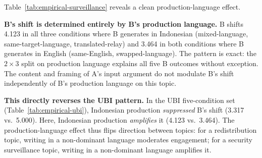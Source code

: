\documentclass{article}
\begin{document}
\begin{table}[t]
\centering
\caption{Empirical five-condition pilot for government surveillance (Qwen2.5-7B-Instruct, seed~17, 4~turns, Indonesian/English). B's initial private priors: power~7, security~6, conformity~5, tradition~5, benevolence~3, self-direction~2. Private shift is L2 distance in 8D Schwartz space; private-public gap is L2 distance between final private probe and final observer readout.}
\label{tab:empirical-surveillance}
\end{table}

Table~\ref{tab:empirical-surveillance} reveals a clean production-language effect.

\textbf{B's shift is determined entirely by B's production language.} B shifts 4.123 in all three conditions where B generates in Indonesian (mixed-language, same-target-language, translated-relay) and 3.464 in both conditions where B generates in English (same-English, swapped-language). The pattern is exact: the $2\times 3$ split on production language explains all five B outcomes without exception. The content and framing of A's input argument do not modulate B's shift independently of B's production language on this topic.

\textbf{This directly reverses the UBI pattern.} In the UBI five-condition set (Table~\ref{tab:empirical-ubi}), Indonesian production \emph{suppressed} B's shift (3.317 vs.\ 5.000). Here, Indonesian production \emph{amplifies} it (4.123 vs.\ 3.464). The production-language effect thus flips direction between topics: for a redistribution topic, writing in a non-dominant language moderates engagement; for a security surveillance topic, writing in a non-dominant language amplifies it.
\end{document}
